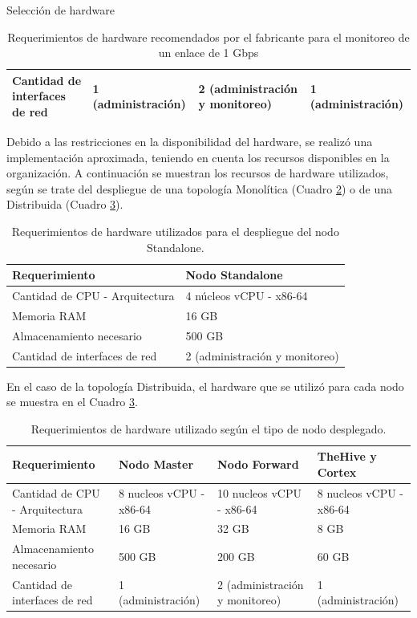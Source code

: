 \begin{subsection}{Selección de hardware}
\begin{table}[H]
\begin{tabular}{|m{9em}|m{9em}|m{9em}|m{9em}|}
    \hline
    Cantidad de interfaces de red & 1 (administración) & 2 (administración y monitoreo) & 1 (administración) \\
    \hline %
    \end{tabular}
    \caption{Requerimientos de hardware recomendados por el fabricante para el monitoreo de un enlace de 1 Gbps}
    \label{table:5}
    \end{table}
    Debido a las restricciones en la disponibilidad del hardware, se realizó una implementación aproximada, teniendo en cuenta los recursos disponibles en la organización. A continuación se muestran los recursos de hardware utilizados, según se trate del despliegue de una topología Monolítica (Cuadro \ref{table:16}) o de una Distribuida (Cuadro \ref{table:12}). \par
    \begin{table}[H]
    \centering
    \begin{tabular}{|m{10em}|m{10em}|}
    \hline 
    Requerimiento  & Nodo Standalone \\ 
    \hline
    Cantidad de CPU - Arquitectura &  4 núcleos vCPU - x86-64  \\ 
    \hline
    Memoria RAM  &  16 GB  \\ 
    \hline
    Almacenamiento necesario   & 500 GB  \\
    \hline
    Cantidad de interfaces de red  & 2 (administración y monitoreo) \\
    \hline %
    \end{tabular}
    \caption{Requerimientos de hardware utilizados para el despliegue del nodo Standalone.}
    \label{table:16}
   \end{table}
    En el caso de la topología Distribuida, el hardware que se utilizó para cada nodo se muestra en el Cuadro \ref{table:12}.
    \begin{table}[H]
    \centering
    \begin{tabular}{|m{9em}|m{9em}|m{9em}|m{9em}|}
    \hline 
    Requerimiento  & Nodo Master &  Nodo Forward & TheHive y Cortex \\ 
    \hline
     Cantidad de CPU - Arquitectura & 8 nucleos vCPU - x86-64 & 10 nucleos vCPU - x86-64 & 8 nucleos vCPU - x86-64 \\ 
    \hline
    Memoria RAM  & 16 GB & 32 GB & 8 GB \\ 
    \hline
    Almacenamiento necesario & 500 GB  & 200 GB & 60 GB \\
    \hline
    Cantidad de interfaces de red & 1 (administración) & 2 (administración y monitoreo) & 1 (administración) \\
    \hline %
    \end{tabular}
    \caption{Requerimientos de hardware utilizado según el tipo de nodo desplegado.}
    \label{table:12}
    \end{table}
    \end{subsection}
